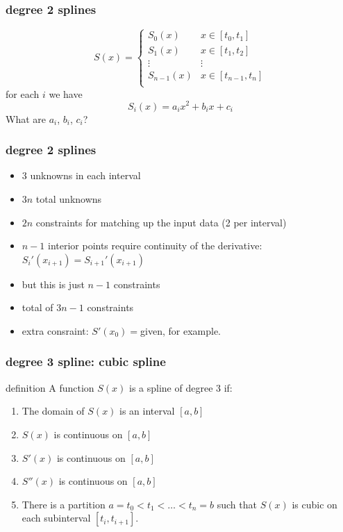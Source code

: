 \documentclass[10pt]{beamer}
\begin{document}
\begin{frame}
\frametitle{degree 2 splines}
\begin{equation*}
  S(x) = \begin{cases}
  S_0(x) &  x\in[t_0,t_1]\\
  S_1(x) &  x\in[t_1,t_2]\\
  \vdots & \vdots \\
  S_{n-1}(x) &  x\in[t_{n-1},t_n]\\
\end{cases}
\end{equation*}
for each $i$ we have
\begin{equation*}
  S_i(x) = a_i x^2 + b_i x + c_i
\end{equation*}
What are $a_i$, $b_i$, $c_i$?
\end{frame}
\begin{frame}
\frametitle{degree 2 splines}
\begin{itemize}
  \item 3 unknowns in each interval
  \item $3n$ total unknowns
  \item $2n$ constraints for matching up the input data (2 per interval)
  \item $n-1$ interior points require continuity of the derivative:
$S_{i}'(x_{i+1}) = S_{i+1}'(x_{i+1})$
  \item but this is just $n-1$ constraints
  \item total of $3n-1$ constraints
  \item extra consraint: $S'(x_0)=$given, for example.
\end{itemize}
\end{frame}
\begin{frame}
\frametitle{degree 3 spline: cubic spline}
\begin{block}{definition}
A function $S(x)$ is a spline of degree 3 if:
\begin{enumerate}
  \item The domain of $S(x)$ is an interval $[a,b]$
  \item $S(x)$ is continuous on $[a,b]$
  \item $S'(x)$ is continuous on $[a,b]$
  \item $S''(x)$ is continuous on $[a,b]$
  \item There is a partition $a=t_0<t_1<\dots<t_n=b$ such that $S(x)$ is
cubic on each subinterval $[t_i,t_{i+1}]$.
\end{enumerate}
\end{block}
\end{frame}
\end{document}
